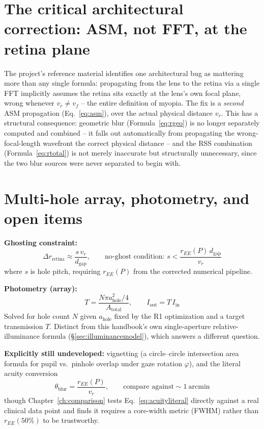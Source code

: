 \documentclass[11pt]{report}
\newcommand{\ahole}{a_{\text{hole}}}
\newcommand{\dgap}{d_{\text{gap}}}
\newcommand{\vr}{v_r}
\newcommand{\vf}{v_f}
\begin{document}
\section{The critical architectural correction: ASM, not FFT, at the retina plane}
\label{sec:bugfix1}
The project's reference material identifies one architectural bug as mattering more than any single formula: propagating from the lens to the retina via a single FFT implicitly assumes the retina sits exactly at the lens's own focal plane, wrong whenever $\vr \ne \vf$ -- the entire definition of myopia. The fix is a \emph{second} ASM propagation (Eq.~\ref{eq:asm}), over the actual physical distance $\vr$. This has a structural consequence: geometric blur (Formula~\ref{eq:rgeo}) is no longer separately computed and combined -- it falls out automatically from propagating the wrong-focal-length wavefront the correct physical distance -- and the RSS combination (Formula~\ref{eq:rtotal}) is not merely inaccurate but structurally unnecessary, since the two blur sources were never separated to begin with.

\section{Multi-hole array, photometry, and open items}

\textbf{Ghosting constraint:}
\begin{equation}
\Delta r_{\text{retina}} \approx \frac{s\,\vr}{\dgap}, \qquad \text{no-ghost condition: } s < \frac{r_{EE}(P)\,\dgap}{\vr}
\label{eq:ghosting}
\end{equation}
where $s$ is hole pitch, requiring $r_{EE}(P)$ from the corrected numerical pipeline.

\textbf{Photometry (array):}
\begin{equation}
T = \frac{N\pi \ahole^2/4}{A_{\text{total}}}, \qquad I_{\text{out}} = T\, I_{\text{in}}
\label{eq:photometryarray}
\end{equation}
Solved for hole count $N$ given $\ahole$ fixed by the R1 optimization and a target transmission $T$. Distinct from this handbook's own single-aperture relative-illuminance formula (\S\ref{sec:illuminancemodel}), which answers a different question.

\textbf{Explicitly still undeveloped:} vignetting (a circle--circle intersection area formula for pupil vs.\ pinhole overlap under gaze rotation $\varphi$), and the literal acuity conversion
\begin{equation}
\theta_{\text{blur}} = \frac{r_{EE}(P)}{\vr}, \qquad \text{compare against} \sim 1\ \text{arcmin}
\label{eq:acuityliteral}
\end{equation}
though Chapter~\ref{ch:comparison} tests Eq.~\ref{eq:acuityliteral} directly against a real clinical data point and finds it requires a core-width metric (FWHM) rather than $r_{EE}(50\%)$ to be trustworthy.
\end{document}
